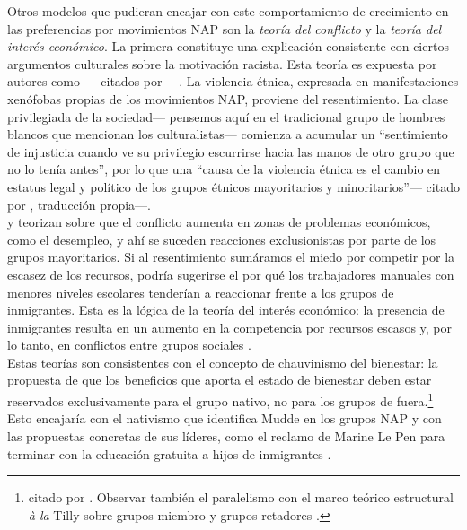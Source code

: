 Otros modelos que pudieran encajar con este comportamiento de crecimiento en las preferencias por movimientos NAP son la \textit{teoría del conflicto} y la \textit{teoría del interés económico}. La primera constituye una explicación consistente con ciertos argumentos culturales sobre la motivación racista. Esta teoría es expuesta por autores como \textcite{Blalock67,Olzak92}--- citados por \textcite{Coffe07}---. La violencia étnica, expresada en manifestaciones xenófobas propias de los movimientos NAP, proviene del resentimiento. La clase privilegiada de la sociedad--- pensemos aquí en el tradicional grupo de hombres blancos que mencionan los culturalistas--- comienza a acumular un ``sentimiento de injusticia cuando ve su privilegio escurrirse hacia las manos de otro grupo que no lo tenía antes'', por lo que una ``causa de la violencia étnica es el cambio en estatus legal y político de los grupos étnicos mayoritarios y minoritarios''--- \textcite{Petersen02} citado por \textcite{Beauchamp16b}, traducción propia---.\\ 

 \textcite{Blalock67} y \textcite{Olzak92} teorizan sobre que el conflicto aumenta en zonas de problemas económicos, como el desempleo, y ahí se suceden reacciones exclusionistas por parte de los grupos mayoritarios. Si al resentimiento sumáramos el miedo por competir por la escasez de los recursos, podría sugerirse el por qué los trabajadores manuales con menores niveles escolares tenderían a reaccionar frente a los grupos de inmigrantes. Esta es la lógica de la teoría del interés económico: la presencia de inmigrantes resulta en un aumento en la competencia por recursos escasos y, por lo tanto, en conflictos entre grupos sociales \parencite{Coffe07}.\\ 

Estas teorías son consistentes con el concepto de chauvinismo del bienestar: la propuesta de que los beneficios que aporta el estado de bienestar deben estar reservados exclusivamente para el grupo nativo, no para los grupos de fuera.\footnote{\textcite{Kitschelt95} citado por \textcite{Coffe07}. Observar también el paralelismo con el marco teórico estructural \textit{à la} Tilly sobre grupos miembro y grupos retadores \parencite{Skocpol79}.} Esto encajaría con el nativismo que identifica Mudde en los grupos NAP \parencite{Mudde07a,Beauchamp16a} y con las propuestas concretas de sus líderes, como el reclamo de Marine Le Pen para terminar con la educación gratuita a hijos de inmigrantes \parencite{LePen16}.\\


